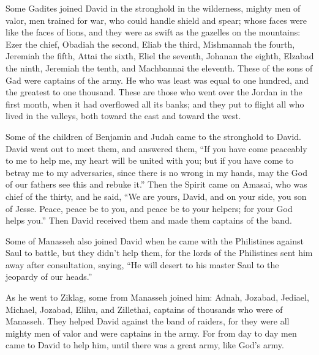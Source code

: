  Some Gadites joined David in the stronghold in the
wilderness, mighty men of valor, men trained for war, who could handle
shield and spear; whose faces were like the faces of lions, and they
were as swift as the gazelles on the mountains:  Ezer the
chief, Obadiah the second, Eliab the third,  Mishmannah the
fourth, Jeremiah the fifth,  Attai the sixth, Eliel the
seventh,  Johanan the eighth, Elzabad the ninth,
 Jeremiah the tenth, and Machbannai the eleventh.
 These of the sons of Gad were captains of the army. He who
was least was equal to one hundred, and the greatest to one thousand.
 These are those who went over the Jordan in the first
month, when it had overflowed all its banks; and they put to flight all
who lived in the valleys, both toward the east and toward the west.

 Some of the children of Benjamin and Judah came to the
stronghold to David.  David went out to meet them, and
answered them, ``If you have come peaceably to me to help me, my heart
will be united with you; but if you have come to betray me to my
adversaries, since there is no wrong in my hands, may the God of our
fathers see this and rebuke it.''  Then the Spirit came on
Amasai, who was chief of the thirty, and he said, ``We are yours, David,
and on your side, you son of Jesse. Peace, peace be to you, and peace be
to your helpers; for your God helps you.'' Then David received them and
made them captains of the band.

 Some of Manasseh also joined David when he came with the
Philistines against Saul to battle, but they didn't help them, for the
lords of the Philistines sent him away after consultation, saying, ``He
will desert to his master Saul to the jeopardy of our heads.''

 As he went to Ziklag, some from Manasseh joined him:
Adnah, Jozabad, Jediael, Michael, Jozabad, Elihu, and Zillethai,
captains of thousands who were of Manasseh.  They helped
David against the band of raiders, for they were all mighty men of valor
and were captains in the army.  For from day to day men
came to David to help him, until there was a great army, like God's
army.

